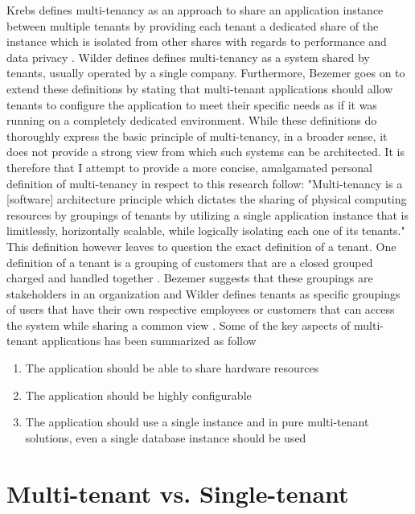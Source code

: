 Krebs defines multi-tenancy as an approach to share an application instance between multiple tenants by providing each tenant a dedicated share of the instance which is isolated from other shares with regards to performance and data privacy \cite{Krebs2012}.
Wilder defines \cite{Wilder2012-so} defines multi-tenancy as a system shared by tenants, usually operated by a single company. Furthermore, Bezemer goes on to extend these definitions by stating that multi-tenant applications should allow tenants to configure the application to meet their specific needs as if it was running on a completely dedicated environment. While these definitions do thoroughly express the basic principle of multi-tenancy, in a broader sense, it does not provide a strong view from which such systems can be architected. It is therefore that I attempt to provide a more concise, amalgamated personal definition of multi-tenancy in respect to this research follow:
"Multi-tenancy is a [software] architecture principle which dictates the sharing of physical computing resources by groupings of tenants by utilizing a single application instance that is limitlessly, horizontally scalable, while logically isolating each one of its tenants."
This definition however leaves to question the exact definition of a tenant. One definition of a tenant is a grouping of customers that are a closed grouped charged and handled together \cite{Krebs2012} . Bezemer suggests that these groupings are stakeholders in an organization  \cite{Bezemer:2010:MSA:1862372.1862393} and Wilder defines tenants as specific groupings of users that have their own respective employees or customers that can access the system while sharing a common view \cite{Wilder2012-so}.
Some of the key aspects of multi-tenant applications has been summarized as follow \cite{Bezemer:2010:MSA:1862372.1862393}
\begin{enumerate}
\item The application should be able to share hardware resources
\item The application should be highly configurable
\item  The application should use a single instance and in pure multi-tenant solutions, even a single database instance should be used
\end{enumerate}

\section{Multi-tenant vs. Single-tenant}

